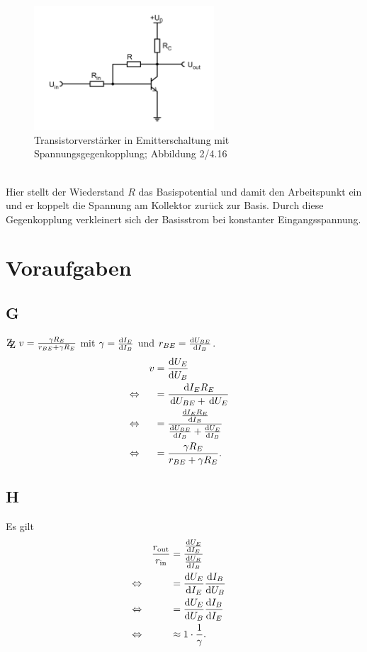 \documentclass[a4paper,12pt]{article}
\newcommand{\td}{\,\text{d}}
\newcommand{\zz}{\mathrm{Z\kern-.3em\raise-0.5ex\hbox{Z} }}
\numberwithin{equation}{section}
\begin{document}
\begin{figure}[h]
        \centering
        \includegraphics[width=0.6\textwidth]{spannungsgegenkopplung.png}
        \caption{Transistorverstärker in Emitterschaltung mit Spannungsgegenkopplung; Abbildung 2/4.16 \cite{Praktikumsanleitung}}
        \vspace{100cm}
\end{figure}\\
Hier stellt der Wiederstand $R$ das Basispotential und damit den Arbeitspunkt ein und er koppelt die Spannung am Kollektor zurück zur Basis.
Durch diese Gegenkopplung verkleinert sich der Basisstrom bei konstanter Eingangsspannung.

\clearpage
\section{Voraufgaben}
\subsection{G}
$\zz\ v=\tfrac{\gamma R_E}{r_{BE}+\gamma R_E}$ mit $\gamma =\diff[]{I_E}{I_B}$ und $r_{BE}=\diff[]{U_{BE}}{I_B}$.
\begin{align} 
        && v &= \diff[]{U_E}{U_B} &&\\
        \Leftrightarrow && &= \dfrac{\td I_ER_E}{\td U_{BE}+\td U_E} &&\nonumber \\
        \Leftrightarrow && &= \dfrac{\diff[]{I_ER_E}{I_B}}{\diff[]{U_{BE}}{I_B}+\diff[]{U_E}{I_B}} &&\nonumber \\
        \Leftrightarrow && &= \dfrac{\gamma R_E}{r_{BE}+\gamma R_E}. &&
\end{align} 

\subsection{H}
Es gilt
\begin{align} 
        && \dfrac{r_\text{out}}{r_\text{in}} &= \dfrac{\diff[]{U_E}{I_E}}{\diff[]{U_B}{I_B}} &&\\
        \Leftrightarrow && &= \diff[]{U_E}{I_E}\diff[]{I_B}{U_B} &&\nonumber \\
        \Leftrightarrow && &= \diff[]{U_E}{U_B}\diff[]{I_B}{I_E} &&\nonumber \\
        \Leftrightarrow && &\approx 1\cdot \dfrac{1}{\gamma }. &&
\end{align} 
\end{document}
